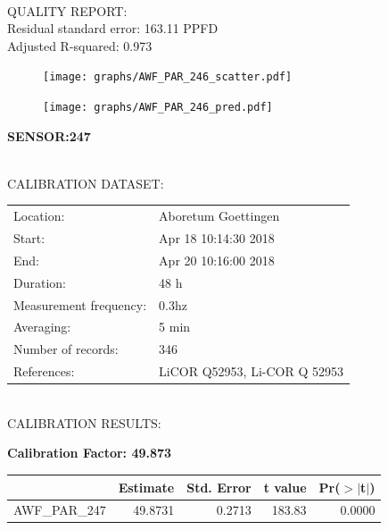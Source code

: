 \documentclass[oneside]{report}
\begin{document}
\hrulefill\\
QUALITY REPORT:\\
Residual standard error: 163.11 PPFD\\
Adjusted R-squared: 0.973



\begin{figure}[H]
  \centering
  \texttt{[image: graphs/AWF\_PAR\_246\_scatter.pdf]}
\end{figure}




\begin{figure}[H]
  \centering
  \texttt{[image: graphs/AWF\_PAR\_246\_pred.pdf]}
\end{figure}

\pagebreak


\begin{center}
\large{\textbf{SENSOR:247}}\\
\end{center}

\hrulefill\\
CALIBRATION DATASET:\\
\begin{table}[h!]
  \centering
  \label{tab:table1}
  \begin{tabular}{ll}
    Location: & Aboretum Goettingen\\ 
    
    
    Start:  & Apr 18 10:14:30 2018 \\
    End:   & Apr 20 10:16:00 2018\\ 
    Duration: & 48 h\\
    Measurement frequency: & 0.3hz\\
    Averaging:  &5 min\\
    Number of records: & 346 \\
    References: & LiCOR Q52953, Li-COR Q 52953 \\
  \end{tabular}
\end{table}

\hrulefill\\
CALIBRATION RESULTS:\\


\begin{center}
\textbf{\large{Calibration Factor: 49.873}}\\
\end{center}
\begin{table}[ht]
\centering
\begin{tabular}{rrrrr}
  \hline
 & Estimate & Std. Error & t value & Pr($>$$|$t$|$) \\ 
  \hline
AWF\_PAR\_247 & 49.8731 & 0.2713 & 183.83 & 0.0000 \\ 
   \hline
\end{tabular}
\end{table}
\end{document}
